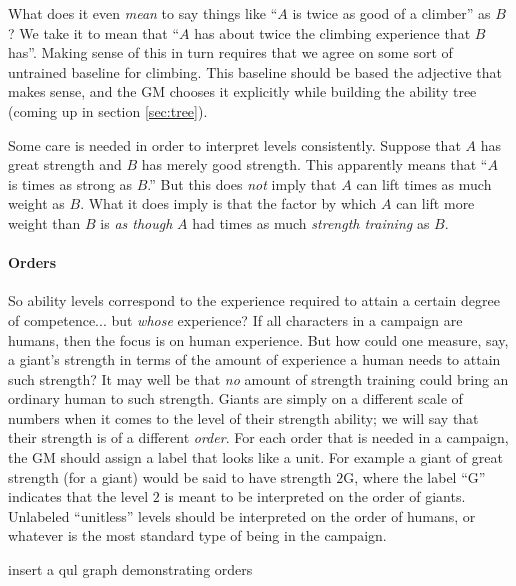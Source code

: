 \documentclass[12pt]{article}
\newcommand{\notes}[1]{{\color{Tan} #1}}
\newcommand{\emdex}[1]{\emph{#1}\index{#1}}
\begin{document}
What does it even \emph{mean} to say things like ``$A$ is twice as good of a climber'' as $B$?
We take it to mean that ``$A$ has about twice the climbing experience that $B$ has''.
Making sense of this in turn requires that we agree on some sort of untrained baseline for climbing.
This baseline should be based the adjective that makes sense, and the GM chooses it
explicitly while building the ability tree (coming up in section \ref{sec:tree}).

Some care is needed in order to interpret levels consistently.
Suppose that $A$ has great strength and $B$ has merely good strength.
This apparently means that ``$A$ is  times as strong as $B$.''
But this does \emph{not} imply that $A$ can lift  times as much weight as $B$.
What it does imply is that the factor by which $A$ can lift more weight than $B$ is
\emph{as though} $A$ had  times as much \emph{strength training} as $B$.

\paragraph{Orders}
So ability levels correspond to the experience required to attain a certain degree of competence...
but \emph{whose} experience?
If all characters in a campaign are humans, then the focus is on human experience.
But how could one measure, say, a giant's strength in terms of the amount of experience a human needs to attain such strength?
It may well be that \emph{no} amount of strength training could bring an ordinary human to such strength.
Giants are simply on a different scale of numbers when it comes to the level of their strength ability;
we will say that their strength is of a different \emdex{order}.
For each order that is needed in a campaign, the GM should assign a label that looks like a unit.
For example a giant of great strength (for a giant) would be said to have strength $2$G,
where the label ``G'' indicates that the level $2$ is meant to be interpreted on the order of giants.
Unlabeled ``unitless'' levels should be interpreted on the order of humans, or whatever is the
most standard type of being in the campaign.

\notes{insert a qul graph demonstrating orders}
\end{document}
